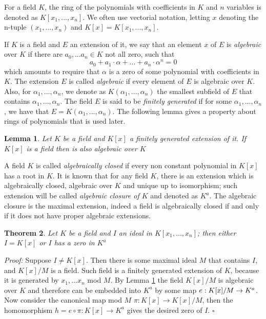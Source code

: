 \documentclass[a4paper,12pt,oneside]{book}
\newtheorem{theorem}{Theorem}[chapter]
\newtheorem{lemma}[theorem]{Lemma}
\newcommand*{\QED}{\hfill\ensuremath{\square}}
\begin{document}
For a field $K$, the ring of the polynomials with coefficients in $K$ and $n$ variables is denoted as $K[x_1,...,x_n ]$. We often use vectorial notation, letting  $x$ denoting the n-tuple $(x_1,...,x_n)$ and $K[x]= K[x_1,...,x_n ] $.


If $K$ is a field and $E$ an extension of it, we say that an element $x$ of $E$ is \textit{algebraic} over $K$ if there are $a_0, ... a_n\in K$ not all zero, such that
$$ a_0 + a_1 \cdot \alpha + ...+ a_n \cdot \alpha^n=0 $$ 
which amounts to require that $\alpha$  is a zero of some polynomial with coefficients in $K$. The extension $E$ is called \textit{algebraic} if every element of $E$ is algebraic over $K$. 
Also, for $\alpha_1, ...,\alpha_n $, we denote as $K(\alpha_1, ...,\alpha_n) $ the smallest subfield of $E$ that contains $\alpha_1, ...,\alpha_n$. The field $E$ is said to be \textit{finitely generated} if for some $\alpha_1, ...,\alpha_n$, we have that $E=K(\alpha_1, ...,\alpha_n)$. 
The following lemma gives a property about rings of polynomials that is used later.
\begin{lemma}\label{finit_gen}
Let $K$ be a field and $K[x]$ a finitely generated extension of it. If $K[x]$ is a field then is also algebraic over $K$
\end{lemma}

A field $K$ is called \textit{algebraically closed} if every non constant polynomial in $K[x]$ has a root in $K$. It is known that for any field $K$, there is an extension which is algebraically closed, algebraic over $K$ and unique up to isomorphism;  such extension will be called \textit{algebraic closure of $K$} and denoted as $K^a$. The algebraic closure is the maximal extension, indeed a field is algebraically closed if and only if it does not have proper algebraic extensions. 

\begin{theorem}\label{zeros}
Let $K$ be a field and $I$ an ideal in $K[x_1,...,x_n]$; then either $I=K[x]$ or $I$ has a zero in $K^a$
\end{theorem}

\textit{Proof:}
Suppose $I\neq K[x]$. Then there is some maximal ideal $M$ that contains $I$, and $K[x]/M$ is a field. Such field is a finitely generated extension of $K$, because it is generated by $x_1, ... x_n$ mod $M$. By Lemma \ref{finit_gen} the field $K[x]/M$ is algebraic over $K$ and therefore can be embedded into $K^a$ by some map $e:K[x]/M \rightarrow\nobreak K^a$. Now consider the canonical map mod $M$  $\pi : K[x] \rightarrow K[x]/M$, then the homomorphism $h=e\circ\pi : K[x]\rightarrow K^a$ gives the desired zero of $I$. \QED
\end{document}
